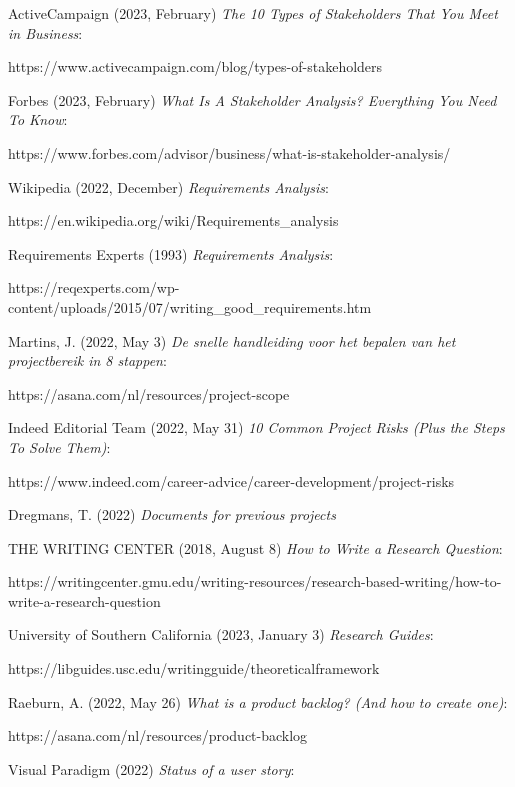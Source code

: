 \documentclass[10pt]{report}
\begin{document}
\begin{thebibliography}{1}
\thispagestyle{fancy}

ActiveCampaign (2023, February) \emph{The 10 Types of Stakeholders That You Meet in Business}:

https://www.activecampaign.com/blog/types-of-stakeholders

Forbes (2023, February) \emph{What Is A Stakeholder Analysis? Everything You Need To Know}:

https://www.forbes.com/advisor/business/what-is-stakeholder-analysis/

Wikipedia (2022, December) \emph{Requirements Analysis}:

https://en.wikipedia.org/wiki/Requirements\_analysis

Requirements Experts (1993) \emph{Requirements Analysis}:

https://reqexperts.com/wp-content/uploads/2015/07/writing\_good\_requirements.htm

Martins, J. (2022, May 3) \emph{De snelle handleiding voor het bepalen van het projectbereik in 8 stappen}:

https://asana.com/nl/resources/project-scope

Indeed Editorial Team (2022, May 31) \emph{10 Common Project Risks (Plus the Steps To Solve Them)}:

https://www.indeed.com/career-advice/career-development/project-risks

Dregmans, T. (2022) \emph{Documents for previous projects}

THE WRITING CENTER (2018, August 8) \emph{How to Write a Research Question}:

https://writingcenter.gmu.edu/writing-resources/research-based-writing/how-to-write-a-research-question

University of Southern California (2023, January 3) \emph{Research Guides}:

https://libguides.usc.edu/writingguide/theoreticalframework

 Raeburn, A. (2022, May 26) \emph{What is a product backlog? (And how to create one)}:

https://asana.com/nl/resources/product-backlog

Visual Paradigm (2022) \emph{Status of a user story}:


\end{thebibliography}
\end{document}
